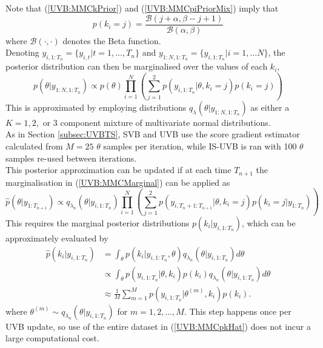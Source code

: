 \documentclass[12pt,a4paper]{article}\usepackage[]{graphicx}\usepackage[]{color}
\begin{document}
Note that (\ref{UVB:MMCkPrior}) and (\ref{UVB:MMCpiPriorMix}) imply that 
\begin{equation}
\label{UVB:MMCkMarginalMix}
p(k_i = j) = \frac{\mathcal{B}(j + \alpha, \beta - j + 1)}{\mathcal{B}(\alpha, \beta)}
\end{equation}
where $\mathcal{B}(\cdot, \cdot)$ denotes the Beta function.
\\

Denoting $y_{i, 1:T_n} = \{y_{i, t} | t = 1, \ldots, T_n\}$ and $y_{1:N, 1:T_n} = \{y_{i, 1:T_n} | i = 1, \ldots N \}$, the posterior distribution can then be marginalised over the values of each $k_i$,
\begin{equation}
\label{UVB:MMCMarginal}
p(\theta | y_{1:N, 1:T_n}) \propto p(\theta) \prod_{i=1}^N \left( \sum_{j=1}^2 p(y_{i, 1:T_n} | \theta, k_i = j) p(k_i = j) \right)
\end{equation}
This is approximated by employing distributions $q_{\lambda}(\theta | y_{1:N, 1:T_n})$ as either a $K = 1, 2,$ or $3$ component mixture of multivariate normal distributions. 
\\

As in Section \ref{subsec:UVBTS}, SVB and UVB use the score gradient estimator calculated from $M = 25$ $\theta$ samples per iteration, while IS-UVB is ran with 100 $\theta$ samples re-used between iterations.
\\

This posterior approximation can be updated if at each time $T_{n+1}$ the marginalisation in (\ref{UVB:MMCMarginal}) can be applied as
\begin{equation}
\label{UVB:MMCUpdate}
\hat{p}(\theta | y_{1:T_{n+1}}) \propto q_{\lambda_{n}}(\theta | y_{i, 1:T_{n}}) \prod_{i=1}^N \left( \sum_{j=1}^2 p(y_{i, T_n+1:T_{n+1}} | \theta, k_i = j) p(k_i = j | y_{1:T_n}) \right)
\end{equation}
This requires the marginal posterior distributions $p(k_i | y_{i, 1:T_{n}})$, which can be  approximately evaluated by
\begin{align}
\hat{p}(k_i | y_{i, 1:T_{n}}) &= \int_{\theta} p(k_i | y_{i, 1:T_{n}}, \theta)q_{\lambda_{n}}(\theta | y_{i, 1:T_{n}}) d\theta \nonumber \\
&\propto \int_{\theta} p(y_{i, 1:T_n} | \theta, k_i) p(k_i) q_{\lambda_{n}}(\theta | y_{i, 1:T_{n}}) d\theta \nonumber \\
&\approx \frac{1}{M} \sum_{m=1}^M p(y_{i, 1:T_n} | \theta^{(m)} , k_i) p(k_i). \label{UVB:MMCpkHat}
\end{align}
where $\theta^{(m)} \sim q_{\lambda_{n}}(\theta | y_{i, 1:T_{n}})$ for $m = 1, 2, \ldots, M$. This step happens once per UVB update, so use of the entire dataset in (\ref{UVB:MMCpkHat}) does not incur a large computational cost.
\\
\end{document}
